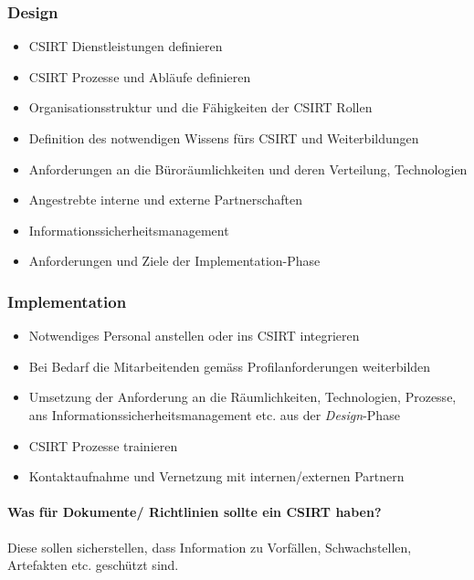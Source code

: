\subsubsection{Design}
\begin{itemize}
    \item CSIRT Dienstleistungen definieren
    \item CSIRT Prozesse und Abläufe definieren
    \item Organisationsstruktur und die Fähigkeiten der CSIRT Rollen
    \item Definition des notwendigen Wissens fürs CSIRT und Weiterbildungen
    \item Anforderungen an die Büroräumlichkeiten und deren Verteilung, Technologien
    \item Angestrebte interne und externe Partnerschaften
    \item Informationssicherheitsmanagement
    \item Anforderungen und Ziele der Implementation-Phase
\end{itemize}

\subsubsection{Implementation}
\begin{itemize}
    \item Notwendiges Personal anstellen oder ins CSIRT integrieren
    \item Bei Bedarf die Mitarbeitenden gemäss Profilanforderungen weiterbilden
    \item Umsetzung der Anforderung an die Räumlichkeiten, Technologien, Prozesse, ans Informationssicherheitsmanagement etc. aus der \textit{Design}-Phase
    \item CSIRT Prozesse trainieren
    \item Kontaktaufnahme und Vernetzung mit internen/externen Partnern
\end{itemize}

\paragraph{Was für Dokumente/ Richtlinien sollte ein CSIRT haben?}
Diese sollen sicherstellen, dass Information zu Vorfällen, Schwachstellen, Artefakten etc. geschützt sind.\\

